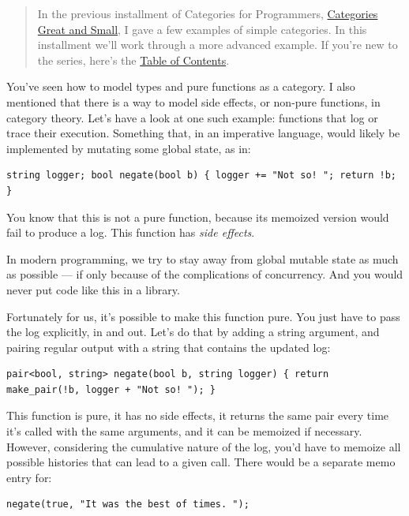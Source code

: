 \begin{quote}
In the previous installment of Categories for Programmers,
\href{https://bartoszmilewski.com/2014/12/05/categories-great-and-small/}{Categories
Great and Small}, I gave a few examples of simple categories. In this
installment we'll work through a more advanced example. If you're new to
the series, here's the
\href{https://bartoszmilewski.com/2014/10/28/category-theory-for-programmers-the-preface/}{Table
of Contents}.
\end{quote}

You've seen how to model types and pure functions as a category. I also
mentioned that there is a way to model side effects, or non-pure
functions, in category theory. Let's have a look at one such example:
functions that log or trace their execution. Something that, in an
imperative language, would likely be implemented by mutating some global
state, as in:

\begin{verbatim}
string logger; bool negate(bool b) { logger += "Not so! "; return !b; }
\end{verbatim}

You know that this is not a pure function, because its memoized version
would fail to produce a log. This function has \emph{side effects}.

In modern programming, we try to stay away from global mutable state as
much as possible --- if only because of the complications of
concurrency. And you would never put code like this in a library.

Fortunately for us, it's possible to make this function pure. You just
have to pass the log explicitly, in and out. Let's do that by adding a
string argument, and pairing regular output with a string that contains
the updated log:

\begin{verbatim}
pair<bool, string> negate(bool b, string logger) { return make_pair(!b, logger + "Not so! "); }
\end{verbatim}

This function is pure, it has no side effects, it returns the same pair
every time it's called with the same arguments, and it can be memoized
if necessary. However, considering the cumulative nature of the log,
you'd have to memoize all possible histories that can lead to a given
call. There would be a separate memo entry for:

\begin{verbatim}
negate(true, "It was the best of times. ");
\end{verbatim}

